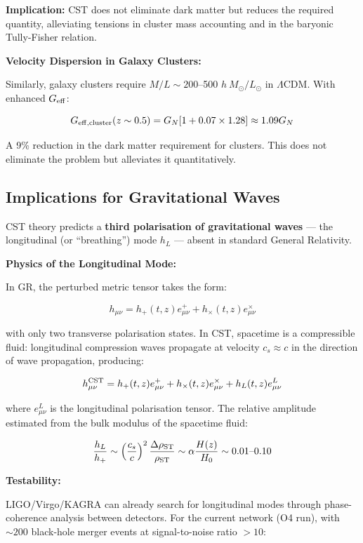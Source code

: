 \documentclass[11pt,a4paper]{article}
\begin{document}
\textbf{Implication:} CST does not eliminate dark matter but reduces the
required quantity, alleviating tensions in cluster mass accounting and
in the baryonic Tully-Fisher relation.

\textbf{Velocity Dispersion in Galaxy Clusters:}

Similarly, galaxy clusters require \(M/L \sim 200\)--500
\(h~M_\odot/L_\odot\) in \(\Lambda\)CDM. With enhanced \(G_{\rm eff}\):

\[G_{\rm eff,cluster}(z \sim 0.5) = G_N[1 + 0.07 \times 1.28] \approx 1.09 G_N\]

A 9\% reduction in the dark matter requirement for clusters. This does
not eliminate the problem but alleviates it quantitatively.

\hypertarget{implications-for-gravitational-waves}{%
\subsection{Implications for Gravitational
Waves}\label{implications-for-gravitational-waves}}

CST theory predicts a \textbf{third polarisation of gravitational waves}
--- the longitudinal (or ``breathing'') mode \(h_L\) --- absent in
standard General Relativity.

\textbf{Physics of the Longitudinal Mode:}

In GR, the perturbed metric tensor takes the form:

\[h_{\mu\nu} = h_+(t,z) e^+_{\mu\nu} + h_\times(t,z) e^\times_{\mu\nu}\]

with only two transverse polarisation states. In CST, spacetime is a
compressible fluid: longitudinal compression waves propagate at velocity
\(c_s \approx c\) in the direction of wave propagation, producing:

\[h_{\mu\nu}^{\rm CST} = h_+(t,z) e^+_{\mu\nu} + h_\times(t,z) e^\times_{\mu\nu} + h_L(t,z) e^L_{\mu\nu}\]

where \(e^L_{\mu\nu}\) is the longitudinal polarisation tensor. The
relative amplitude estimated from the bulk modulus of the spacetime
fluid:

\[\frac{h_L}{h_+} \sim \left(\frac{c_s}{c}\right)^2 \frac{\Delta\rho_{\rm ST}}{\rho_{\rm ST}} \sim \alpha \frac{H(z)}{H_0} \sim 0.01\text{--}0.10\]

\textbf{Testability:}

LIGO/Virgo/KAGRA can already search for longitudinal modes through
phase-coherence analysis between detectors. For the current network (O4
run), with \(\sim 200\) black-hole merger events at signal-to-noise
ratio \(> 10\):
\end{document}
